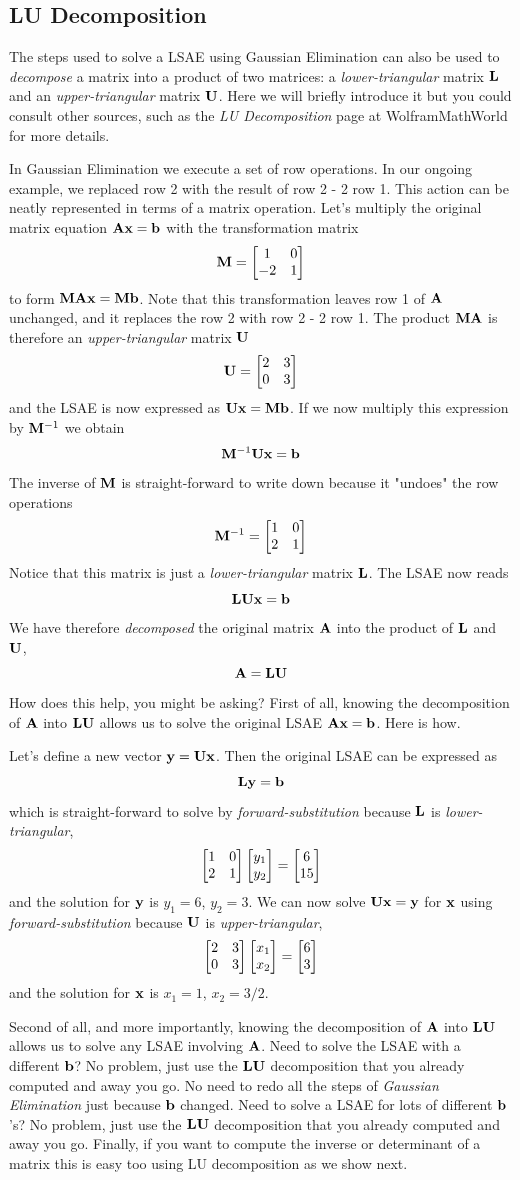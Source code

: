 \subsection{LU Decomposition}
The steps used to solve a LSAE using Gaussian Elimination can also be used to \textit{decompose} a matrix into a product of two matrices: a \textit{lower-triangular} matrix $\mathbf{L}$ and an \textit{upper-triangular} matrix $\mathbf{U}$. Here we will briefly introduce it but you could consult other sources, such as the \textit{LU Decomposition} page at WolframMathWorld for more details.

In Gaussian Elimination we execute a set of row operations. In our ongoing example, we replaced row 2 with the result of row 2 - 2 row 1. This action can be neatly represented in terms of a matrix operation. Let's multiply the original matrix equation $\mathbf{A} \mathbf{x} = \mathbf{b}$ with the transformation matrix
\[ \mathbf{M} = \begin{bmatrix} 1 & 0 \\ -2 & 1\end{bmatrix} \]
to form $\mathbf{M} \mathbf{A} \mathbf{x} = \mathbf{M} \mathbf{b}$. Note that this transformation leaves row 1 of $\mathbf{A}$ unchanged, and it replaces the row 2 with row 2 - 2 row 1. The product $\mathbf{M} \mathbf{A}$ is therefore an \textit{upper-triangular} matrix $\mathbf{U}$
\[ \mathbf{U} = \begin{bmatrix} 2 & 3 \\ 0 & 3\end{bmatrix} \]
and the LSAE is now expressed as $\mathbf{U} \mathbf{x} = \mathbf{M} \mathbf{b}$. If we now multiply this expression by $\mathbf{M}^{-1}$  we obtain
\[ \mathbf{M}^{-1} \mathbf{U} \mathbf{x} = \mathbf{b} \]
The inverse of $\mathbf{M}$ is straight-forward to write down because it "undoes" the row operations
\[ \mathbf{M}^{-1} = \begin{bmatrix} 1 & 0 \\ 2 & 1\end{bmatrix} \]
Notice that this matrix is just a \textit{lower-triangular} matrix $\mathbf{L}$. The LSAE now reads
\[ \mathbf{L} \mathbf{U} \mathbf{x} = \mathbf{b} \]
We have therefore \textit{decomposed} the original matrix $\mathbf{A}$ into the product of $\mathbf{L}$ and $\mathbf{U}$,
\[ \mathbf{A} = \mathbf{L} \mathbf{U} \]
How does this help, you might be asking? First of all, knowing the decomposition of $\mathbf{A}$ into $\mathbf{L} \mathbf{U}$ allows us to solve the original LSAE $\mathbf{A} \mathbf{x} = \mathbf{b}$. Here is how.

Let's define a new vector $\mathbf{y} = \mathbf{U} \mathbf{x}$. Then the original LSAE can be expressed as
\[ \mathbf{L} \mathbf{y} = \mathbf{b} \]
which is straight-forward to solve by \textit{forward-substitution} because $\mathbf{L}$ is \textit{lower-triangular},
\[ \begin{bmatrix} 1 & 0 \\ 2 & 1\end{bmatrix} \begin{bmatrix} y_1 \\ y_2 \end{bmatrix} = \begin{bmatrix} 6 \\ 15 \end{bmatrix} \]
and the solution for $\mathbf{y}$ is $y_1 = 6$, $y_2 = 3$. We can now solve $\mathbf{U} \mathbf{x} = \mathbf{y}$ for $\mathbf{x}$ using \textit{ forward-substitution} because $\mathbf{U}$ is \textit{upper-triangular},
\[ \begin{bmatrix} 2 & 3 \\ 0 & 3\end{bmatrix} \begin{bmatrix} x_1 \\ x_2 \end{bmatrix} = \begin{bmatrix} 6 \\ 3 \end{bmatrix} \]
and the solution for $\mathbf{x}$ is $x_1 = 1$, $x_2 = 3/2$.

Second of all, and more importantly, knowing the decomposition of $\mathbf{A}$ into $\mathbf{L} \mathbf{U}$ allows us to solve any LSAE involving $\mathbf{A}$. Need to solve the LSAE with a different $\mathbf{b}$? No problem, just use the $\mathbf{L} \mathbf{U}$ decomposition that you already computed and away you go. No need to redo all the steps of \textit{ Gaussian Elimination} just because $\mathbf{b}$ changed. Need to solve a LSAE for lots of different $\mathbf{b}$'s? No problem, just use the $\mathbf{L} \mathbf{U}$ decomposition that you already computed and away you go. Finally, if you want to compute the inverse or determinant of a matrix this is easy too using LU decomposition as we show next. 

